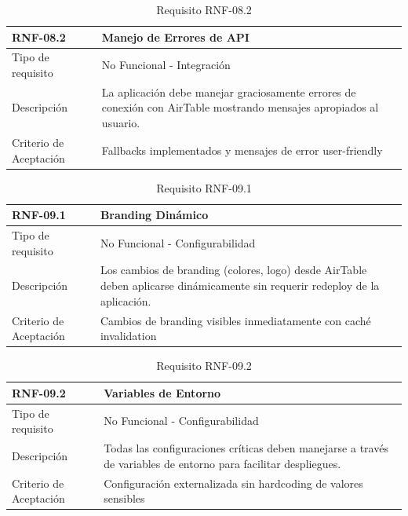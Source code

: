 \begin{table}[H]
\centering
\begin{tabular}{|p{3cm}|p{10cm}|}
\hline
\rowcolor{tealblue}
{\textbf{RNF-08.2}} & {\textbf{Manejo de Errores de API}} \\
\hline
Tipo de requisito & No Funcional - Integración \\
\hline
Descripción & La aplicación debe manejar graciosamente errores de conexión con AirTable mostrando mensajes apropiados al usuario. \\
\hline
Criterio de Aceptación & Fallbacks implementados y mensajes de error user-friendly \\
\hline
\end{tabular}
\caption{Requisito RNF-08.2}
\end{table}


\begin{table}[H]
\centering
\begin{tabular}{|p{3cm}|p{10cm}|}
\hline
\rowcolor{tealblue}
{\textbf{RNF-09.1}} & {\textbf{Branding Dinámico}} \\
\hline
Tipo de requisito & No Funcional - Configurabilidad \\
\hline
Descripción & Los cambios de branding (colores, logo) desde AirTable deben aplicarse dinámicamente sin requerir redeploy de la aplicación. \\
\hline
Criterio de Aceptación & Cambios de branding visibles inmediatamente con caché invalidation \\
\hline
\end{tabular}
\caption{Requisito RNF-09.1}
\end{table}

\begin{table}[H]
\centering
\begin{tabular}{|p{3cm}|p{10cm}|}
\hline
\rowcolor{tealblue}
{\textbf{RNF-09.2}} & {\textbf{Variables de Entorno}} \\
\hline
Tipo de requisito & No Funcional - Configurabilidad \\
\hline
Descripción & Todas las configuraciones críticas deben manejarse a través de variables de entorno para facilitar despliegues. \\
\hline
Criterio de Aceptación & Configuración externalizada sin hardcoding de valores sensibles \\
\hline
\end{tabular}
\caption{Requisito RNF-09.2}
\end{table}

